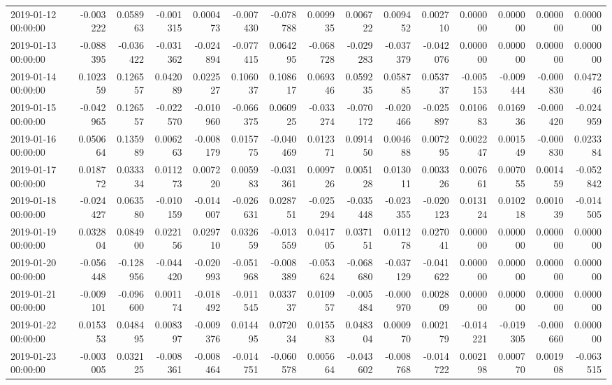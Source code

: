 \begin{tabular}{lrrrrrrrrrrrrrr}
2019-01-12 00:00:00 & -0.003222 & 0.058963 & -0.001315 & 0.000473 & -0.007430 & -0.078788 & 0.009935 & 0.006722 & 0.009452 & 0.002710 & 0.000000 & 0.000000 & 0.000000 & 0.000000 \\
2019-01-13 00:00:00 & -0.088395 & -0.036422 & -0.031362 & -0.024894 & -0.077415 & 0.064295 & -0.068728 & -0.029283 & -0.037379 & -0.042076 & 0.000000 & 0.000000 & 0.000000 & 0.000000 \\
2019-01-14 00:00:00 & 0.102359 & 0.126557 & 0.042089 & 0.022527 & 0.106037 & 0.108617 & 0.069346 & 0.059235 & 0.058785 & 0.053737 & -0.005153 & -0.009444 & -0.000830 & 0.047246 \\
2019-01-15 00:00:00 & -0.042965 & 0.126557 & -0.022570 & -0.010960 & -0.066375 & 0.060925 & -0.033274 & -0.070172 & -0.020466 & -0.025897 & 0.010683 & 0.016936 & -0.000420 & -0.024959 \\
2019-01-16 00:00:00 & 0.050664 & 0.135989 & 0.006263 & -0.008179 & 0.015775 & -0.040469 & 0.012371 & 0.091450 & 0.004688 & 0.007295 & 0.002247 & 0.001549 & -0.000830 & 0.023384 \\
2019-01-17 00:00:00 & 0.018772 & 0.033334 & 0.011273 & 0.007220 & 0.005983 & -0.031361 & 0.009726 & 0.005128 & 0.013011 & 0.003326 & 0.007661 & 0.007055 & 0.001459 & -0.052842 \\
2019-01-18 00:00:00 & -0.024427 & 0.063580 & -0.010159 & -0.014007 & -0.026631 & 0.028751 & -0.025294 & -0.035448 & -0.023355 & -0.020123 & 0.013124 & 0.010218 & 0.001039 & -0.014505 \\
2019-01-19 00:00:00 & 0.032804 & 0.084900 & 0.022156 & 0.029710 & 0.032659 & -0.013559 & 0.041705 & 0.037151 & 0.011278 & 0.027041 & 0.000000 & 0.000000 & 0.000000 & 0.000000 \\
2019-01-20 00:00:00 & -0.056448 & -0.128956 & -0.044420 & -0.020993 & -0.051968 & -0.008389 & -0.053624 & -0.068680 & -0.037129 & -0.041622 & 0.000000 & 0.000000 & 0.000000 & 0.000000 \\
2019-01-21 00:00:00 & -0.009101 & -0.096600 & 0.001174 & -0.018492 & -0.011545 & 0.033737 & 0.010957 & -0.005484 & -0.000970 & 0.002809 & 0.000000 & 0.000000 & 0.000000 & 0.000000 \\
2019-01-22 00:00:00 & 0.015353 & 0.048495 & 0.008397 & -0.009376 & 0.014495 & 0.072034 & 0.015583 & 0.048304 & 0.000970 & 0.002179 & -0.014221 & -0.019305 & -0.000660 & 0.000000 \\
2019-01-23 00:00:00 & -0.003005 & 0.032125 & -0.008361 & -0.008464 & -0.014751 & -0.060578 & 0.005664 & -0.043602 & -0.008768 & -0.014722 & 0.002198 & 0.000770 & 0.001908 & -0.063515 \\

\end{tabular}
